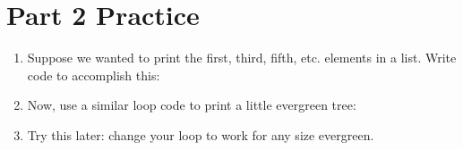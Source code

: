 \documentclass[letterpaper,10pt,english]{sphinxmanual}
\begin{document}
\section{Part 2 Practice}
\label{\detokenize{lecture_notes/lec09_loops1_while:part-2-practice}}\begin{enumerate}
\def\theenumi{\arabic{enumi}}
\def\labelenumi{\theenumi .}
\makeatletter\def\p@enumii{\p@enumi \theenumi .}\makeatother
\item {} 
Suppose we wanted to print the first, third, fifth, etc. elements
in a list. Write code to accomplish this:

\begin{sphinxVerbatim}[commandchars=\\\{\}]
\PYG{p}{[}           \PYG{p}{]}
\end{sphinxVerbatim}

\item {} 
Now, use a similar loop code to print a little evergreen tree:

\begin{sphinxVerbatim}[commandchars=\\\{\}]
\end{sphinxVerbatim}

\item {} 
Try this later: change your loop to work for any size evergreen.

\end{enumerate}
\end{document}
